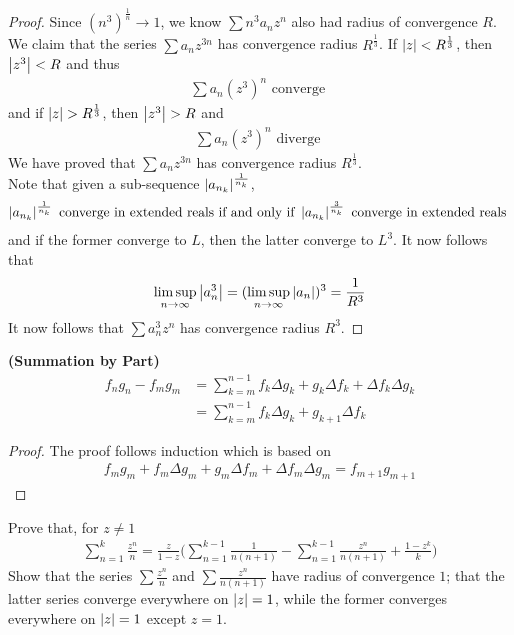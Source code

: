 \documentclass{report}
\begin{document}
\begin{proof}
Since $(n^3)^{\frac{1}{n}}\to 1$, we know $\sum n^3a_nz^n$ also had radius of convergence $R$. We claim that the series $\sum a_nz^{3n}$ has convergence radius $R^{\frac{1}{3}}$. If $\left|z\right|<R^{\frac{1}{3}}$, then $\left|z^3\right|< R$ and thus 
\begin{align*}
\sum a_n(z^3)^n\text{ converge }
\end{align*}
and if $\abso{z}>R^{\frac{1}{3}}$, then $\abso{z^3}>R$ and 
\begin{align*}
\sum a_n(z^3)^n\text{ diverge }
\end{align*}
We have proved that $\sum  a_nz^{3n}$ has convergence radius $R^{\frac{1}{3}}$. \\

Note that given a sub-sequence $\left|a_{n_k}\right|^{\frac{1}{n_k}}$, 
\begin{align*}
  \left|a_{n_k}\right|^{\frac{1}{n_k}}\text{ converge in extended reals if and only if }\left|a_{n_k}\right|^{\frac{3}{n_k}}\text{ converge in extended reals }
\end{align*}
and if the former converge to $L$, then the latter converge to  $L^3$. It now follows that 
 \begin{align*}
   \limsup_{n\to\infty} \left|a_n^3\right|= (\limsup_{n\to\infty} \left|a_n\right|)^3 = \frac{1}{R^3}
\end{align*}
It now follows that $\sum a_n^3 z^n$ has convergence radius $R^3$. 
\end{proof}
\begin{theorem}
\label{Summation by Part}
\textbf{(Summation by Part)} 
\begin{align*}
  f_ng_n-f_mg_m&=\sum_{k=m}^{n-1}f_k \Delta g_k + g_k \Delta f_k+ \Delta f_k \Delta g_k \\
  &=\sum_{k=m}^{n-1}f_k \Delta g_k + g_{k+1}\Delta f_k
\end{align*}
\end{theorem}
\begin{proof}
The proof follows induction which is based on 
\begin{align*}
f_mg_m+ f_m\Delta g_m+ g_m \Delta f_m +\Delta f_m \Delta g_m=f_{m+1}g_{m+1}
\end{align*} 
\end{proof}
\begin{question}{}{}
Prove that, for $z\neq 1$
\begin{align*}
\sum_{n=1}^k \frac{z^n}{n}= \frac{z}{1-z}\Big( \sum_{n=1}^{k-1}\frac{1}{n(n+1)} - \sum_{n=1}^{k-1} \frac{z^n}{n(n+1)} + \frac{1-z^k}{k} \Big)
\end{align*}
Show that the series $\sum \frac{z^n}{n}$ and $\sum \frac{z^n}{n(n+1)}$ have radius of convergence $1$; that the latter series converge everywhere on  $\left|z\right|=1$, while the former converges everywhere on $\left|z\right|=1$ except $z=1$. 
\end{question}
\end{document}
